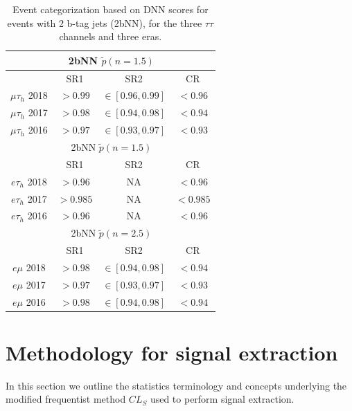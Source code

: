 \begin{table}[h!]
    \begin{center}
       \begin{tabular}{|c|c|c|c|}
       \hline
        & \multicolumn{2}{c}{2bNN $\tilde{p}(n=1.5)$} & \\
       \hline
        & SR1 & SR2 & CR \\
       \hline
       $\mu\tau_{h}$ 2018 & $>0.99$ & $\in[0.96,0.99]$ & $<0.96$ \\
       $\mu\tau_{h}$ 2017 & $>0.98$ & $\in[0.94,0.98]$ & $<0.94$ \\
       $\mu\tau_{h}$ 2016 & $>0.97$ & $\in[0.93,0.97]$ & $<0.93$ \\
       \hline
       \hline
        & \multicolumn{2}{c}{2bNN $\tilde{p}(n=1.5)$} & \\
       \hline
        & SR1 & SR2 & CR \\
       \hline
       $e\tau_{h}$ 2018 & $>0.96$ & NA & $<0.96$ \\
       $e\tau_{h}$ 2017 & $>0.985$ & NA & $<0.985$ \\
       $e\tau_{h}$ 2016 & $>0.96$ & NA & $<0.96$ \\
       \hline
       \hline
        & \multicolumn{2}{c}{2bNN $\tilde{p}(n=2.5)$} & \\
       \hline
        & SR1 & SR2 & CR \\
       \hline
       $e\mu$ 2018 & $>0.98$ & $\in[0.94,0.98]$ & $<0.94$ \\
       $e\mu$ 2017 & $>0.97$ & $\in[0.93,0.97]$ & $<0.93$ \\
       $e\mu$ 2016 & $>0.98$ & $\in[0.94,0.98]$ & $<0.94$ \\
       \hline
      \end{tabular}
    \end{center}
    \caption{Event categorization based on DNN scores for events with 2 b-tag jets (2bNN), for the three $\tau\tau$ channels and three eras.}
    \label{table:2bNN-final-categories}
\end{table}


\section{Methodology for signal extraction}
In this section we outline the statistics terminology and concepts underlying the modified frequentist method $CL_{S}$ used to perform signal extraction.

